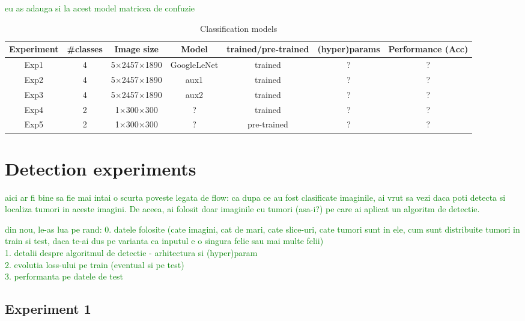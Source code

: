 \textcolor{green}{eu as adauga si la acest model matricea de confuzie}


\begin{table}[!ht]
    \centering
    \begin{tabular}{|c|c|c|c|c|c|c|}
        \hline
        Experiment & \#classes & Image size & Model & trained/pre-trained & (hyper)params & Performance (Acc) \\
        \hline\hline
        Exp1 & 4 & 5$\times$2457$\times$1890 & GoogleLeNet & trained & ? & ?\\
        \hline
        Exp2 & 4 & 5$\times$2457$\times$1890 & aux1 & trained & ? & ?\\
        \hline
        Exp3 & 4 & 5$\times$2457$\times$1890 & aux2 & trained & ? & ?\\
        \hline
        Exp4 & 2 & 1$\times$300$\times$300 & ? & trained & ? & ?\\
        \hline
        Exp5 & 2 & 1$\times$300$\times$300 & ? & pre-trained & ? & ?\\
        \hline    
    \end{tabular}
    \caption{Classification models}
    \label{tab:classificationModels}
\end{table}


\section{Detection experiments}

\textcolor{green}{aici ar fi bine sa fie mai intai o scurta poveste legata de flow: ca dupa ce au fost clasificate imaginile, ai vrut sa vezi daca poti detecta si localiza tumori in aceste imagini. De aceea, ai folosit doar imaginile cu tumori (asa-i?) pe care ai aplicat un algoritm de detectie.}

\textcolor{green}{din nou, le-as lua pe rand:
0. datele folosite (cate imagini, cat de mari, cate slice-uri, cate tumori sunt in ele, cum sunt distribuite tumori in train si test, daca te-ai dus pe varianta ca inputul e o singura felie sau mai multe felii)\\
1. detalii despre algoritmul de detectie - arhitectura si (hyper)param\\
2. evolutia loss-ului pe train (eventual si pe test)\\
3. performanta pe datele de test\\}

\subsection{Experiment 1}


